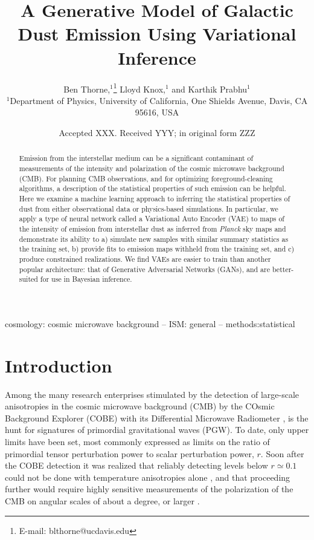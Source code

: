 \documentclass[fleqn,usenatbib]{mnras}
\title[Generative modeling of Galactic dust]{A Generative Model of Galactic Dust Emission Using Variational Inference}
\author[B. Thorne et al.]{
Ben Thorne,$^{1}$\thanks{E-mail: blthorne@ucdavis.edu}
Lloyd Knox,$^{1}$
and Karthik Prabhu$^{1}$
\\
$^{1}$Department of Physics, University of California, One Shields Avenue, Davis, CA 95616, USA\\
}
\date{Accepted XXX. Received YYY; in original form ZZZ}
\begin{document}
\label{firstpage}
\pagerange{\pageref{firstpage}--\pageref{lastpage}}
\maketitle

\begin{abstract}
Emission from the interstellar medium can be a significant contaminant of measurements of the intensity and polarization of the cosmic microwave background (CMB). For planning CMB observations, and for optimizing foreground-cleaning algorithms, a description of the statistical properties of such emission can be helpful. Here we examine a machine learning approach to inferring the statistical properties of dust from either observational data or physics-based simulations. In particular, we apply a type of neural network called a Variational Auto Encoder (VAE) to maps of the intensity of emission from interstellar dust as inferred from {\it Planck} sky maps and demonstrate its ability to a) simulate new samples with similar summary statistics as the training set, b) provide fits to emission maps withheld from the training set, and c) produce constrained realizations. We find VAEs are easier to train than another popular architecture: that of Generative Adversarial Networks (GANs), and are better-suited for use in Bayesian inference. 
\end{abstract}

\begin{keywords}
cosmology: cosmic microwave background -- ISM: general -- methods:statistical 
\end{keywords}



\section{Introduction}
\label{sec:introduction} 

Among the many research enterprises stimulated by the detection of large-scale anisotropies in the cosmic microwave background (CMB) by the COsmic Background Explorer (COBE) with its Differential Microwave Radiometer \citep{smoot92}, is the hunt for signatures of primordial gravitational waves (PGW). To date, only upper limits have been set, most commonly expressed as limits on the ratio of primordial tensor perturbation power to scalar perturbation power, $r$. Soon after the COBE detection it was realized that reliably detecting levels below $r \simeq 0.1$ could not be done with temperature anisotropies alone \citep{knox94}, and that proceeding further would require highly sensitive measurements of the polarization of the CMB on angular scales of about a degree, or larger \citep{kamionkowski97,seljak97}. 
\end{document}
